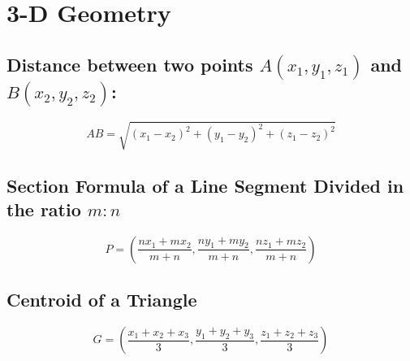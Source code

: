 \chapter{3-D Geometry}
\section{Distance between two points $A(x_1,y_1,z_1)$ and $B(x_2,y_2,z_2)$:\newline}
\begin{equation}
	AB=\sqrt{(x_1-x_2)^2+(y_1-y_2)^2+(z_1-z_2)^2}
\end{equation}


\section{Section Formula of a Line Segment Divided in the ratio $m:n$\newline}
\begin{equation}
	P=\left(\dfrac{nx_1+mx_2}{m+n},\dfrac{ny_1+my_2}{m+n},\dfrac{nz_1+mz_2}{m+n}\right)
\end{equation}


\section{Centroid of a Triangle\newline}
\begin{equation}
	G=\left(\dfrac{x_1+x_2+x_3}{3},\dfrac{y_1+y_2+y_3}{3},\dfrac{z_1+z_2+z_3}{3}\right)
\end{equation}
